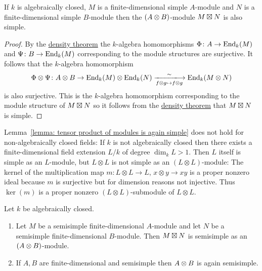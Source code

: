 \begin{lemma}
  \label{lemma: tensor product of modules is again simple}
  If $k$ is algebraically closed, $M$ is a finite-dimensional simple $A$-module and $N$ is a finite-dimensional simple $B$-module then the $(A \mathbin{\otimes} B)$-module $M \mathbin{\boxtimes} N$ is also simple.
\end{lemma}


\begin{proof}
  By the \hyperref[theorem: density theorem]{density theorem} the $k$-algebra homomorphisms $\Phi \colon A \to \operatorname{End}_k(M)$ and $\Psi \colon B \to \operatorname{End}_k(M)$ corresponding to the module structures are surjective.
  It follows that the $k$-algebra homomorphism
  \[
            \Phi \tensor \Psi
    \colon  A \tensor B
    \to     \End_k(M) \tensor \End_k(N)
    \xlongrightarrow[f \tensor g \mapsto f \tensor g]{\sim} 
            \End_k(M \tensor N)
  \]
  is also surjective.
  This is the $k$-algebra homomorphism corresponding to the module structure of $M \mathbin{\boxtimes} N$ so it follows from the \hyperref[theorem: density theorem]{density theorem} that $M \mathbin{\boxtimes} N$ is simple.
\end{proof}


\begin{warning}
  Lemma~\ref{lemma: tensor product of modules is again simple} does not hold for non-algebraically closed fields:
  If $k$ is not algebraically closed then there exists a finite-dimensional field extension $L/k$ of degree $\dim_k L > 1$.
  Then $L$ itself is simple as an $L$-module, but $L \otimes L$ is not simple as an $(L \otimes L)$-module:
  The kernel of the multiplication map $m \colon L \otimes L \to L$, $x \otimes y \to xy$ is a proper nonzero ideal because $m$ is surjective but for dimension reasons not injective.
  Thus $\ker(m)$ is a proper nonzero $(L \otimes L)$-submodule of $L \otimes L$.
\end{warning}


\begin{corollary}
  Let $k$ be algebraically closed.
  \begin{enumerate}
    \item
      \label{enumerate: outer tensor product of semisimple modules}
      Let $M$ be a semisimple finite-dimensional $A$-module and let $N$ be a semisimple finite-dimensional $B$-module.
      Then $M \mathbin{\boxtimes} N$ is semisimple as an $(A \mathbin{\otimes} B)$-module.
    \item
      If $A, B$ are finite-dimensional and semisimple then $A \mathbin{\otimes} B$ is again semisimple.
  \end{enumerate}
\end{corollary}


